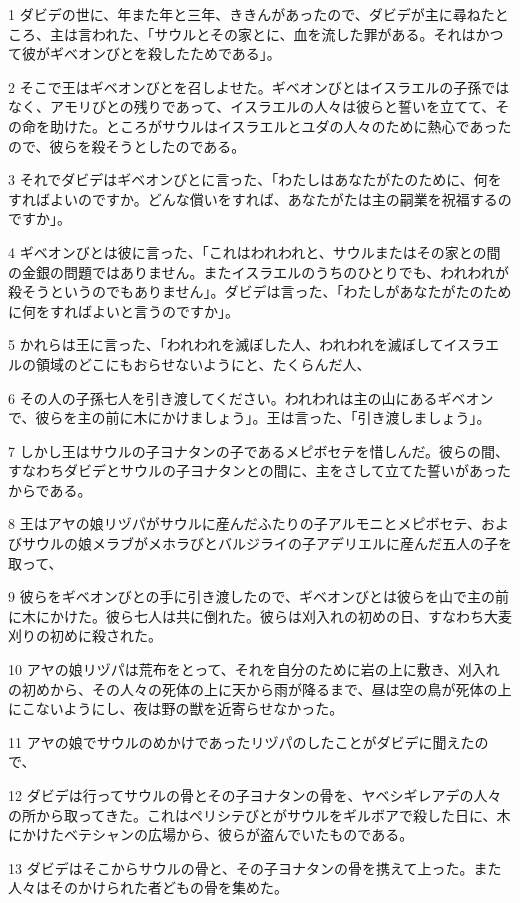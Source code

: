 \par 1 ダビデの世に、年また年と三年、ききんがあったので、ダビデが主に尋ねたところ、主は言われた、「サウルとその家とに、血を流した罪がある。それはかつて彼がギベオンびとを殺したためである」。
\par 2 そこで王はギベオンびとを召しよせた。ギベオンびとはイスラエルの子孫ではなく、アモリびとの残りであって、イスラエルの人々は彼らと誓いを立てて、その命を助けた。ところがサウルはイスラエルとユダの人々のために熱心であったので、彼らを殺そうとしたのである。
\par 3 それでダビデはギベオンびとに言った、「わたしはあなたがたのために、何をすればよいのですか。どんな償いをすれば、あなたがたは主の嗣業を祝福するのですか」。
\par 4 ギベオンびとは彼に言った、「これはわれわれと、サウルまたはその家との間の金銀の問題ではありません。またイスラエルのうちのひとりでも、われわれが殺そうというのでもありません」。ダビデは言った、「わたしがあなたがたのために何をすればよいと言うのですか」。
\par 5 かれらは王に言った、「われわれを滅ぼした人、われわれを滅ぼしてイスラエルの領域のどこにもおらせないようにと、たくらんだ人、
\par 6 その人の子孫七人を引き渡してください。われわれは主の山にあるギベオンで、彼らを主の前に木にかけましょう」。王は言った、「引き渡しましょう」。
\par 7 しかし王はサウルの子ヨナタンの子であるメピボセテを惜しんだ。彼らの間、すなわちダビデとサウルの子ヨナタンとの間に、主をさして立てた誓いがあったからである。
\par 8 王はアヤの娘リヅパがサウルに産んだふたりの子アルモニとメピボセテ、およびサウルの娘メラブがメホラびとバルジライの子アデリエルに産んだ五人の子を取って、
\par 9 彼らをギベオンびとの手に引き渡したので、ギベオンびとは彼らを山で主の前に木にかけた。彼ら七人は共に倒れた。彼らは刈入れの初めの日、すなわち大麦刈りの初めに殺された。
\par 10 アヤの娘リヅパは荒布をとって、それを自分のために岩の上に敷き、刈入れの初めから、その人々の死体の上に天から雨が降るまで、昼は空の鳥が死体の上にこないようにし、夜は野の獣を近寄らせなかった。
\par 11 アヤの娘でサウルのめかけであったリヅパのしたことがダビデに聞えたので、
\par 12 ダビデは行ってサウルの骨とその子ヨナタンの骨を、ヤベシギレアデの人々の所から取ってきた。これはペリシテびとがサウルをギルボアで殺した日に、木にかけたベテシャンの広場から、彼らが盗んでいたものである。
\par 13 ダビデはそこからサウルの骨と、その子ヨナタンの骨を携えて上った。また人々はそのかけられた者どもの骨を集めた。
